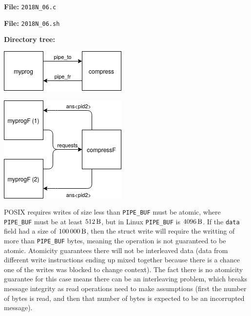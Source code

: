 \documentclass{sope}
\begin{document}
\textbf{File:} \texttt{2018N\_06.c}

\textbf{File:} \texttt{2018N\_06.sh}

\textbf{Directory tree:}


\begin{center}
    \includegraphics[scale=0.5]{2018N_07_a}
\end{center}


\begin{center}
    \includegraphics[scale=0.5]{2018N_07_b}
\end{center}


POSIX requires writes of size less than \texttt{PIPE\_BUF} must be atomic, where \texttt{PIPE\_BUF} must be at least $\SI{512}{\byte}$, but in Linux \texttt{PIPE\_BUF} is $\SI{4096}{\byte}$. If the \texttt{data} field had a size of $\SI{100000}{\byte}$, then the struct write will require the writting of more than \texttt{PIPE\_BUF} bytes, meaning the operation is not guaranteed to be atomic. Atomicity guarantees there will not be interleaved data (data from different write instructions ending up mixed together because there is a chance one of the writes was blocked to change context). The fact there is no atomicity guarantee for this case means there can be an interleaving problem, which breaks message integrity as read operations need to make assumptions (first the number of bytes is read, and then that number of bytes is expected to be an incorrupted message).
\end{document}

